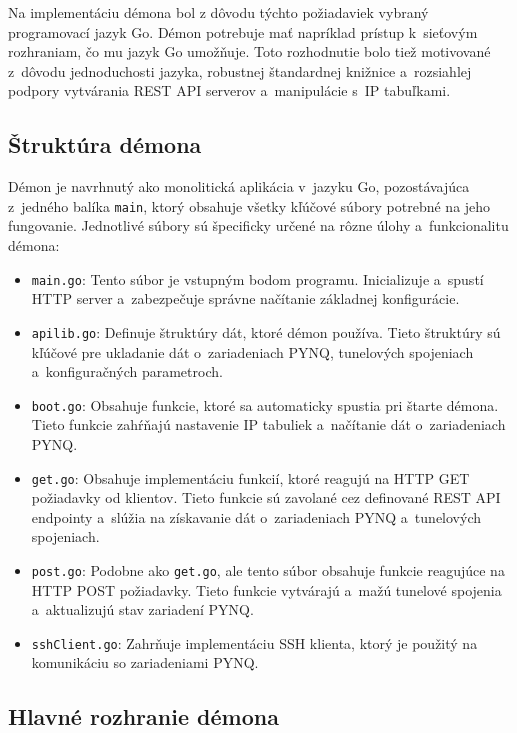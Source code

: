 Na implementáciu démona bol z dôvodu týchto požiadaviek vybraný programovací jazyk Go. Démon potrebuje mať napríklad prístup k~sieťovým rozhraniam, čo mu jazyk Go umožňuje. Toto rozhodnutie bolo tiež motivované z~dôvodu jednoduchosti jazyka, robustnej štandardnej knižnice a~rozsiahlej podpory vytvárania REST API serverov a~manipulácie s~IP tabuľkami.

\subsection{Štruktúra démona}

Démon je navrhnutý ako monolitická aplikácia v~jazyku Go, pozostávajúca z~jedného balíka \verb|main|, ktorý obsahuje všetky kľúčové súbory potrebné na jeho fungovanie. Jednotlivé súbory sú špecificky určené na rôzne úlohy a~funkcionalitu démona:

\begin{itemize}
    \item \verb|main.go|: Tento súbor je vstupným bodom programu. Inicializuje a~spustí HTTP server a~zabezpečuje správne načítanie základnej konfigurácie.
    \item \verb|apilib.go|: Definuje štruktúry dát, ktoré démon používa. Tieto štruktúry sú kľúčové pre ukladanie dát o~zariadeniach PYNQ, tunelových spojeniach a~konfiguračných parametroch.
    \item \verb|boot.go|: Obsahuje funkcie, ktoré sa automaticky spustia pri štarte démona. Tieto funkcie zahŕňajú nastavenie IP tabuliek a~načítanie dát o~zariadeniach PYNQ.
    \item \verb|get.go|: Obsahuje implementáciu funkcií, ktoré reagujú na HTTP GET požiadavky od klientov. Tieto funkcie sú zavolané cez definované REST API endpointy a~slúžia na získavanie dát o~zariadeniach PYNQ a~tunelových spojeniach.
    \item \verb|post.go|: Podobne ako \verb|get.go|, ale tento súbor obsahuje funkcie reagujúce na HTTP POST požiadavky. Tieto funkcie vytvárajú a~mažú tunelové spojenia a~aktualizujú stav zariadení PYNQ. 
    \item \verb|sshClient.go|: Zahrňuje implementáciu SSH klienta, ktorý je použitý na komunikáciu so zariadeniami PYNQ.
\end{itemize}

\subsection{Hlavné rozhranie démona}

